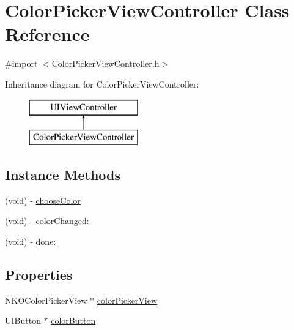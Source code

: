 \hypertarget{interface_color_picker_view_controller}{}\section{Color\+Picker\+View\+Controller Class Reference}
\label{interface_color_picker_view_controller}


{\ttfamily \#import $<$Color\+Picker\+View\+Controller.\+h$>$}

Inheritance diagram for Color\+Picker\+View\+Controller\+:\begin{figure}[H]
\begin{center}
\leavevmode
\includegraphics[height=2.000000cm]{interface_color_picker_view_controller}
\end{center}
\end{figure}
\subsection*{Instance Methods}
\begin{DoxyCompactItemize}
\item 
(void) -\/ \hyperlink{interface_color_picker_view_controller_a364303532f479dd1b60431197b25da51}{choose\+Color}
\item 
(void) -\/ \hyperlink{interface_color_picker_view_controller_af2a42dc41f2d89467ab02a6880808bc5}{color\+Changed\+:}
\item 
(void) -\/ \hyperlink{interface_color_picker_view_controller_a35741b5d6bfe6036c4427294c7805563}{done\+:}
\end{DoxyCompactItemize}
\subsection*{Properties}
\begin{DoxyCompactItemize}
\item 
N\+K\+O\+Color\+Picker\+View $\ast$ \hyperlink{interface_color_picker_view_controller_a2f5094d6c4a72aeb66a800cecc6fed10}{color\+Picker\+View}
\item 
U\+I\+Button $\ast$ \hyperlink{interface_color_picker_view_controller_ae8e90a6cd17c172dde3f76e111385001}{color\+Button}
\end{DoxyCompactItemize}


